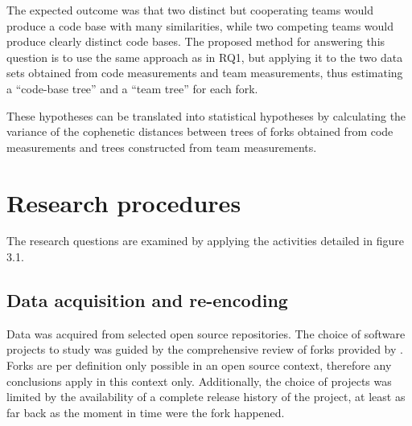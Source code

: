 The expected outcome was that two distinct but cooperating teams would produce a code base with many similarities, while two competing teams would produce clearly distinct code bases. The proposed method for answering this question is to use the same approach as in RQ1, but applying it to the two data sets obtained from code measurements and team measurements, thus estimating a “code-base tree” and a “team tree” for each fork. 



\noindent
These hypotheses can be translated into statistical hypotheses by calculating the variance of the cophenetic distances between trees of forks obtained from code measurements and trees constructed from team measurements.



\section{Research procedures}
The research questions are examined by applying the activities detailed in figure 3.1.

\subsection{Data acquisition and re-encoding}
Data was acquired from selected open source repositories. The choice of software projects to study was guided by the comprehensive review of forks provided by \citet{Robles2012a}. Forks are per definition only possible in an open source context, therefore any conclusions apply in this context only. Additionally, the choice of projects was limited by the availability of a complete release history of the project, at least as far back as the moment in time were the fork happened.

